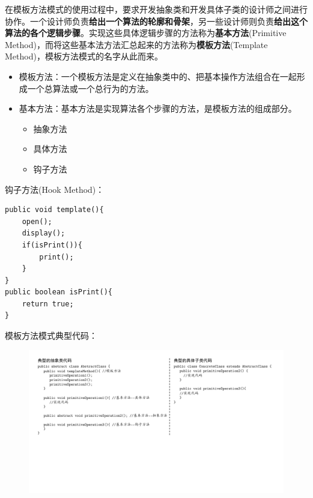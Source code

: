在模板方法模式的使用过程中，要求开发抽象类和开发具体子类的设计师之间进行协作。一个设计师负责\textbf{给出一个算法的轮廓和骨架}，另一些设计师则负责\textbf{给出这个算法的各个逻辑步骤}。实现这些具体逻辑步骤的方法称为\textbf{基本方法}(Primitive Method)，而将这些基本法方法汇总起来的方法称为\textbf{模板方法}(Template Method)，模板方法模式的名字从此而来。
\begin{itemize}
    \item 模板方法：一个模板方法是定义在抽象类中的、把基本操作方法组合在一起形成一个总算法或一个总行为的方法。
    \item 基本方法：基本方法是实现算法各个步骤的方法，是模板方法的组成部分。
    \vspace{-0.8em}
    \begin{multicols}{3}
    \begin{itemize}
        \item 抽象方法
        \item 具体方法
        \item 钩子方法
    \end{itemize}
    \end{multicols}
    \vspace{-1em}
\end{itemize}
钩子方法(Hook Method)：
\begin{lstlisting}
public void template(){
    open();
    display();
    if(isPrint()){
        print();
    }
}
public boolean isPrint(){
    return true;
}
\end{lstlisting}

模板方法模式典型代码：
\begin{figure}[H]
	\centering
	\includegraphics[width=\textwidth]{images/模板方法模式分析.pdf}
    \vspace{-2em}
\end{figure}

